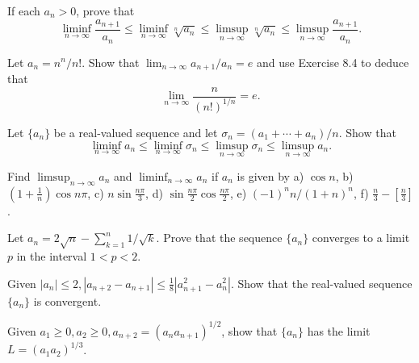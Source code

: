 \begin{problembox}
    If each $a_n > 0$, prove that
    \[
    \liminf_{n \to \infty} \frac{a_{n+1}}{a_n} \leq \liminf_{n \to \infty} \sqrt[n]{a_n} \leq \limsup_{n \to \infty} \sqrt[n]{a_n} \leq \limsup_{n \to \infty} \frac{a_{n+1}}{a_n}.
    \]
\end{problembox}

\begin{problembox}
Let \(a_n = n^n / n!\). Show that \(\lim_{n \to \infty} a_{n+1} / a_n = e\) and use Exercise 8.4 to deduce that
\[\lim_{n \to \infty} \frac{n}{(n!)^{1/n}} = e.\]
\end{problembox}

\begin{problembox}
Let \(\{a_n\}\) be a real-valued sequence and let \(\sigma_n = (a_1 + \cdots + a_n)/n\). Show that
\[\liminf_{n \to \infty} a_n \leq \liminf_{n \to \infty} \sigma_n \leq \limsup_{n \to \infty} \sigma_n \leq \limsup_{n \to \infty} a_n.\]
\end{problembox}

\begin{problembox}
Find \(\limsup_{n \to \infty} a_n\) and \(\liminf_{n \to \infty} a_n\) if \(a_n\) is given by
a) \(\cos n\),    b) \(\left(1 + \frac{1}{n}\right) \cos n\pi\),    c) \(n \sin \frac{n\pi}{3}\), 
d) \(\sin \frac{n\pi}{2} \cos \frac{n\pi}{2}\),    e) \((-1)^n n/(1 + n)^n\),    f) \(\frac{n}{3} - \left[\frac{n}{3}\right]\).
\end{problembox}

\begin{problembox}
Let \(a_n = 2\sqrt{n} - \sum_{k=1}^n 1/\sqrt{k}\). Prove that the sequence \(\{a_n\}\) converges to a limit \(p\) in the interval \(1 < p < 2\).
\end{problembox}

\begin{problembox}
Given \(|a_n| \leq 2, |a_{n+2} - a_{n+1}| \leq \frac{1}{8} |a_{n+1}^2 - a_n^2|\). Show that the real-valued sequence \(\{a_n\}\) is convergent.
\end{problembox}

\begin{problembox}
Given \(a_1 \geq 0, a_2 \geq 0, a_{n+2} = (a_n a_{n+1})^{1/2}\), show that \(\{a_n\}\) has the limit \(L = (a_1 a_2)^{1/3}\).
\end{problembox}

